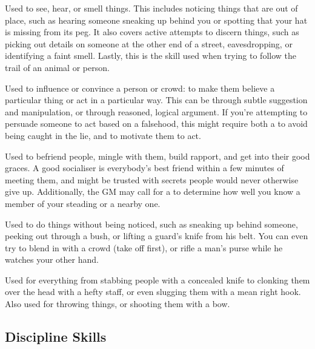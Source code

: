 
Used to see, hear, or smell things.
This includes noticing things that are out of place, such as hearing someone sneaking up behind you or spotting that your hat is missing from its peg.
It also covers active attempts to discern things, such as picking out details on someone at the other end of a street, eavesdropping, or identifying a faint smell.
Lastly, this is the skill used when trying to follow the trail of an animal or person.


Used to influence or convince a person or crowd: to make them believe a particular thing or act in a particular way.
This can be through subtle suggestion and manipulation, or through reasoned, logical argument.
If you're attempting to persuade someone to act based on a falsehood, this might require both a  {\test} to avoid being caught in the lie, and  {\test} to motivate them to act.


Used to befriend people, mingle with them, build rapport, and get into their good graces.
A good socialiser is everybody's best friend within a few minutes of meeting them, and might be trusted with secrets people would never otherwise give up.
Additionally, the GM may call for a  {\test} to determine how well you know a member of your steading or a nearby one.


Used to do things without being noticed, such as sneaking up behind someone, peeking out through a bush, or lifting a guard's knife from his belt.
You can even try to blend in with a crowd (take {\thehat} off first), or rifle a man's purse while he watches your other hand.


Used for everything from stabbing people with a concealed knife to clonking them over the head with a hefty staff, or even slugging them with a mean right hook.
Also used for throwing things, or shooting them with a bow.

\subsection{Discipline Skills}


